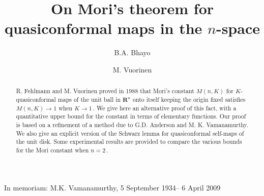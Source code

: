 \documentclass[12pt,a4paper,leqno]{amsart}
\date{}
\newcounter{minutes}\setcounter{minutes}{\time}
\newcounter{hours}\setcounter{hours}{\time}
\theoremstyle{plain}
\numberwithin{equation}{section}          %
\begin{document}
\thispagestyle{empty}





\vspace{1.0cm}
\title[On Mori's theorem for quasiconformal maps]{\large \bf On Mori's theorem for \\quasiconformal maps in the $n$-space}

\def\thefootnote{}
\makeatletter\def\thefootnote{\@arabic\c@footnote}\makeatother



\author[B. A. Bhayo]{B.A. Bhayo}
\address{Department of Mathematics, University of Turku,
FI-20014 Turku, Finland} 

\author[M. Vuorinen]{M. Vuorinen}
\address{Department of Mathematics, University of Turku,
FI-20014 Turku, Finland} 




\maketitle
\bigskip
{\sc In memoriam: M.K. Vamanamurthy, 5 September 1934-- 6 April 2009}
\bigskip

\begin{abstract} R. Fehlmann and M. Vuorinen proved in 1988 that Mori's
constant $M(n,K)$ for $K$-quasiconformal maps of the unit ball in
$\mathbf{R}^n$ onto itself keeping the origin fixed satisfies
$M(n,K) \to 1$ when $K\to 1\,.$ We give here an alternative proof of
this fact, with a quantitative upper bound for the constant in terms
of elementary functions. Our proof is based on a refinement of a
method due to G.D. Anderson and M. K. Vamanamurthy. We also give an
explicit version of the Schwarz lemma for quasiconformal self-maps
of the unit disk. Some experimental results are provided to compare the various bounds
for the Mori constant when $n=2\,.$
\end{abstract}
\end{document}
